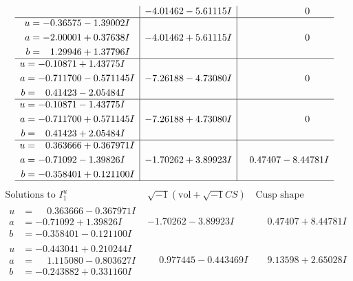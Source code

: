 \documentclass[1p]{elsarticle_modified}
\theoremstyle{definition}
\newcommand{\I}{\sqrt{-1}}
\begin{document}
$$\begin{array}{c|c|c}
 & -4.01462 - 5.61115 I & \phantom{-0.000000 } 0 \\ \hline\begin{aligned}
u &= -0.36575 - 1.39002 I \\
a &= -2.00001 + 0.37638 I \\
b &= \phantom{-}1.29946 + 1.37796 I\end{aligned}
 & -4.01462 + 5.61115 I & \phantom{-0.000000 } 0 \\ \hline\begin{aligned}
u &= -0.10871 + 1.43775 I \\
a &= -0.711700 - 0.571145 I \\
b &= \phantom{-}0.41423 - 2.05484 I\end{aligned}
 & -7.26188 - 4.73080 I & \phantom{-0.000000 } 0 \\ \hline\begin{aligned}
u &= -0.10871 - 1.43775 I \\
a &= -0.711700 + 0.571145 I \\
b &= \phantom{-}0.41423 + 2.05484 I\end{aligned}
 & -7.26188 + 4.73080 I & \phantom{-0.000000 } 0 \\ \hline\begin{aligned}
u &= \phantom{-}0.363666 + 0.367971 I \\
a &= -0.71092 - 1.39826 I \\
b &= -0.358401 + 0.121100 I\end{aligned}
 & -1.70262 + 3.89923 I & \phantom{-}0.47407 - 8.44781 I\\
 \hline 
 \end{array}$$\newpage$$\begin{array}{c|c|c}  
\text{Solutions to }I^u_{1}& \I (\text{vol} + \sqrt{-1}CS) & \text{Cusp shape}\\
 \hline 
\begin{aligned}
u &= \phantom{-}0.363666 - 0.367971 I \\
a &= -0.71092 + 1.39826 I \\
b &= -0.358401 - 0.121100 I\end{aligned}
 & -1.70262 - 3.89923 I & \phantom{-}0.47407 + 8.44781 I \\ \hline\begin{aligned}
u &= -0.443041 + 0.210244 I \\
a &= \phantom{-}1.115080 - 0.803627 I \\
b &= -0.243882 + 0.331160 I\end{aligned}
 & \phantom{-}0.977445 - 0.443469 I & \phantom{-}9.13598 + 2.65028 I \\ \hline\begin{aligned}

\end{aligned}
\end{array}$$
\end{document}
